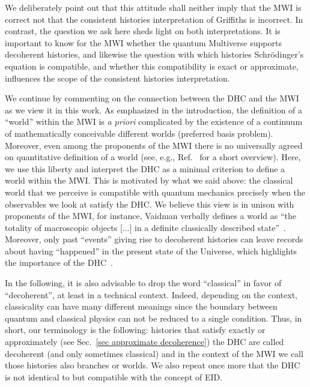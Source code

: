 \documentclass[pre,twocolumn,10pt,aps,longbibliography,nofootinbib]{revtex4-1}
\newcommand{\blue}[1]{#1}
\begin{document}
We deliberately point out that this attitude shall neither imply that the MWI is correct not that the consistent histories interpretation of Griffiths is incorrect. In contrast, the question we ask here sheds light on both interpretations. It is important to know for the MWI whether the quantum Multiverse supports decoherent histories, and likewise the question with which histories Schr\"odinger's equation is compatible, and whether this compatibility is exact or approximate, influences the scope of the consistent histories interpretation.

We continue by commenting on the connection between the DHC and the MWI as we view it in this work. As emphasized in the introduction, the definition of a ``world'' within the MWI is \emph{a priori} complicated by the existence of a continuum of mathematically conceivable different worlds (preferred basis problem). Moreover, even among the proponents of the MWI there is no universally agreed on quantitative definition of a world \blue{(see, e.g., Ref.~\cite{JessRiedelBlog2023} for a short overview)}. Here, we use this liberty and interpret the DHC as a minimal criterion to define a world within the MWI. This is motivated by what we said above: the classical world that we perceive is compatible with quantum mechanics precisely when the observables we look at satisfy the DHC. We believe this view is in unison with proponents of the MWI, for instance, Vaidman verbally defines a world as ``the totality of macroscopic objects [...] in a definite classically described state''~\cite{Vaidman2021}. Moreover, \blue{only past ``events'' giving rise to decoherent histories can leave records about having ``happened'' in the present state of the Universe, which highlights the importance of the DHC}~\cite{AlbrechtPRD1992, GellMannHartlePRD1993, FinkelsteinPRD1993, PazZurekPRD1993, HalliwellPRD1999, DoddHalliwellPRD2003, RiedelZurekZwolakPRA2016, HartleArXiv2016}.

In the following, it is also advisable to drop the word ``classical'' in favor of ``decoherent'', at least in a technical context. Indeed, depending on the context, classicality can have many different meanings since the boundary between quantum and classical physics can not be reduced to a single condition. Thus, in short, our terminology is the following: histories that satisfy exactly or approximately (see Sec.~\ref{sec approximate decoherence}) the DHC are called decoherent (and only sometimes classical) and in the context of the MWI we call those histories also branches or worlds. We also repeat once more that the DHC is not identical to but compatible with the concept of EID.
\end{document}
